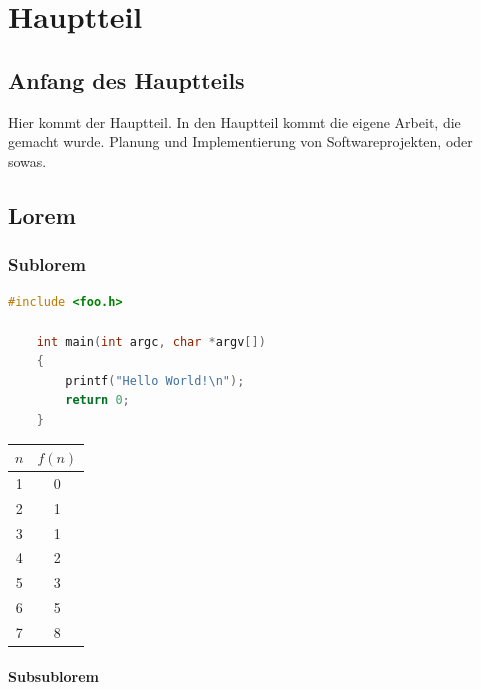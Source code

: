 \chapter{Hauptteil}

\section{Anfang des Hauptteils}

Hier kommt der Hauptteil.
In den Hauptteil kommt die eigene Arbeit, die gemacht wurde.
Planung und Implementierung von Softwareprojekten, oder sowas.

\section{Lorem}

\lipsum[1-3]

\subsection{Sublorem}

\begin{lstlisting}[language=c]
    #include <foo.h>

    int main(int argc, char *argv[])
    {
        printf("Hello World!\n");
        return 0;
    }
\end{lstlisting}

\lipsum[2-3]

\begin{table}[h]
    \centering
    \begin{tabular}{c|c}
        $n$ & $f(n)$ \\ \hline
        1   & 0      \\
        2   & 1      \\
        3   & 1      \\
        4   & 2      \\
        5   & 3      \\
        6   & 5      \\
        7   & 8      \\
    \end{tabular}
\end{table}

\subsubsection{Subsublorem}

